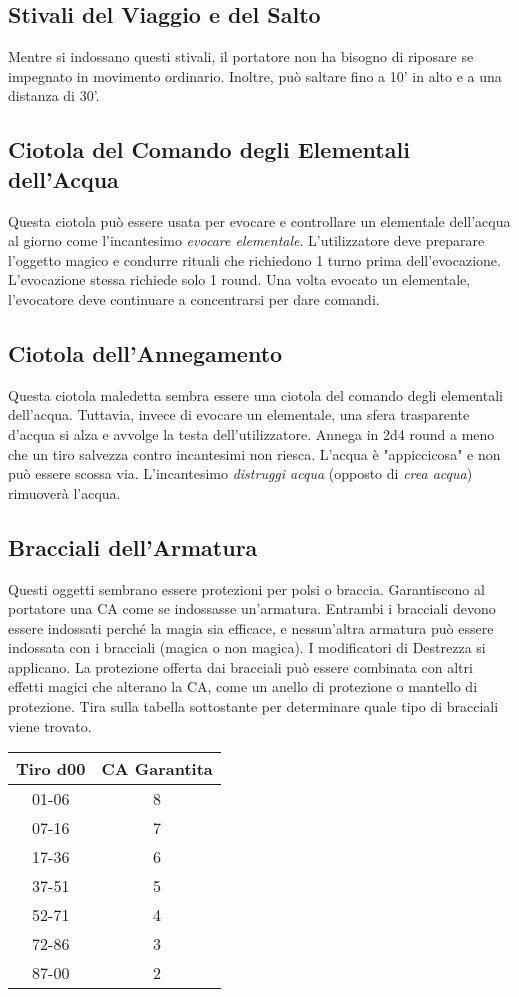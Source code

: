 \documentclass{article}
\begin{document}
\begin{multicols}{2}
\subsection{Stivali del Viaggio e del Salto}
Mentre si indossano questi stivali, il portatore non ha bisogno di riposare se impegnato in movimento ordinario. Inoltre, può saltare fino a 10' in alto e a una distanza di 30'.

\subsection{Ciotola del Comando degli Elementali dell'Acqua}
Questa ciotola può essere usata per evocare e controllare un elementale dell'acqua al giorno come l'incantesimo \textit{evocare elementale}. L'utilizzatore deve preparare l'oggetto magico e condurre rituali che richiedono 1 turno prima dell'evocazione. L'evocazione stessa richiede solo 1 round. Una volta evocato un elementale, l'evocatore deve continuare a concentrarsi per dare comandi.

\subsection{Ciotola dell'Annegamento}
Questa ciotola maledetta sembra essere una ciotola del comando degli elementali dell'acqua. Tuttavia, invece di evocare un elementale, una sfera trasparente d'acqua si alza e avvolge la testa dell'utilizzatore. Annega in 2d4 round a meno che un tiro salvezza contro incantesimi non riesca. L'acqua è "appiccicosa" e non può essere scossa via. L'incantesimo \textit{distruggi acqua} (opposto di \textit{crea acqua}) rimuoverà l'acqua.

\subsection{Bracciali dell'Armatura}
Questi oggetti sembrano essere protezioni per polsi o braccia. Garantiscono al portatore una CA come se indossasse un'armatura. Entrambi i bracciali devono essere indossati perché la magia sia efficace, e nessun'altra armatura può essere indossata con i bracciali (magica o non magica). I modificatori di Destrezza si applicano. La protezione offerta dai bracciali può essere combinata con altri effetti magici che alterano la CA, come un anello di protezione o mantello di protezione. Tira sulla tabella sottostante per determinare quale tipo di bracciali viene trovato.

\begin{table}[h]
\centering
\begin{tabular}{|c|c|}
\hline
\textbf{Tiro d00} & \textbf{CA Garantita} \\
\hline
01-06 & 8 \\
07-16 & 7 \\
17-36 & 6 \\
37-51 & 5 \\
52-71 & 4 \\
72-86 & 3 \\
87-00 & 2 \\
\hline
\end{tabular}


\end{table}
\end{multicols}
\end{document}
